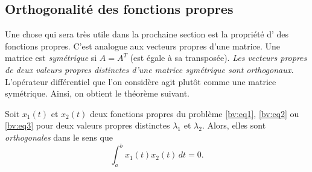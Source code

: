 \subsection{Orthogonalité des fonctions propres}

Une chose qui sera très utile dans la prochaine section est la propriété d'\emph{} des fonctions propres. C'est analogue aux vecteurs propres d'une matrice. Une matrice est 
\emph{symétrique}
si $A = A^T$ (est égale à sa transposée).
\emph{Les vecteurs propres de deux valeurs propres distinctes d'une matrice symétrique sont orthogonaux.}
L'opérateur différentiel que l'on considère agit plutôt comme  une matrice symétrique. Ainsi, on obtient le théorème suivant.  

%
%
%

\begin{theorem} \label{bvp:orthogonaleigen}
Soit  $x_1(t)$ et $x_2(t)$ deux fonctions propres du problème 
\eqref{bv:eq1}, \eqref{bv:eq2} ou \eqref{bv:eq3}
pour deux valeurs propres distinctes $\lambda_1$ et $\lambda_2$. Alors, elles sont
\emph{orthogonales }
dans le sens que
\begin{equation*}
\int_a^b x_1(t) x_2(t) \,dt = 0 .
\end{equation*}
\end{theorem}

